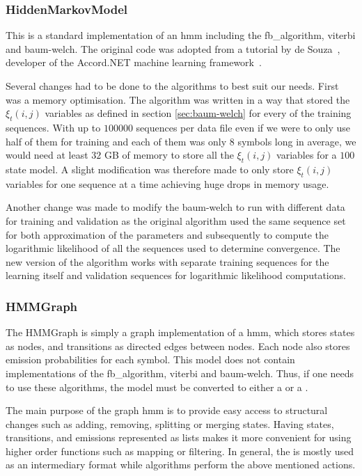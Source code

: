 \subsubsection{HiddenMarkovModel}

This is a standard implementation of an \gls{hmm} including the \gls{fb_algorithm}, \gls{viterbi} and \gls{baum-welch}. The original code was adopted from a tutorial by de Souza~\cite{desouza_hmm}, developer of the Accord.NET machine learning framework~\cite{accord_net}.

Several changes had to be done to the algorithms to best suit our needs. First was a memory optimisation. The algorithm was written in a way that stored the $\xi_t(i,j)$ variables as defined in section \ref{sec:baum-welch} for every of the training sequences. With up to $100000$ sequences per data file even if we were to only use half of them for training and each of them was only $8$ symbols long in average, we would need at least $32$ GB of memory to store all the $\xi_t(i,j)$ variables for a $100$ state model. A slight modification was therefore made to only store $\xi_t(i,j)$ variables for one sequence at a time achieving huge drops in memory usage.

Another change was made to modify the \gls{baum-welch} to run with different data for training and validation as the original algorithm used the same sequence set for both approximation of the parameters and subsequently to compute the logarithmic likelihood of all the sequences used to determine convergence. The new version of the algorithm works with separate training sequences for the learning itself and validation sequences for logarithmic likelihood computations.

\subsubsection{HMMGraph}

The HMMGraph is simply a graph implementation of a \gls{hmm}, which stores states as nodes, and transitions as directed edges between nodes. Each node also stores emission probabilities for each symbol. This model does not contain implementations of the \gls{fb_algorithm}, \gls{viterbi} and \gls{baum-welch}.
Thus, if one needs to use these algorithms, the model must be converted to either a  or a .

The main purpose of the graph \gls{hmm} is to provide easy access to structural changes such as adding, removing, splitting or merging states. Having states, transitions, and emissions represented as lists makes it more convenient for using higher order functions such as mapping or filtering.
In general, the  is mostly used as an intermediary format while algorithms perform the above mentioned actions.

